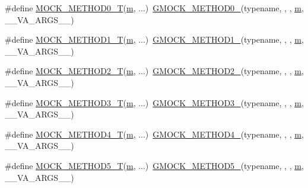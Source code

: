 \begin{DoxyCompactItemize}
\item 
\#define \hyperlink{gmock-generated-function-mockers_8h_a55a5a1a22cec416ead5605a2da39eec8}{M\+O\+C\+K\+\_\+\+M\+E\+T\+H\+O\+D0\+\_\+T}(\hyperlink{app_2main_8cpp_a0d2d8836216fc94b61aa0824eb239db2}{m}, ...)~\hyperlink{gmock-generated-function-mockers_8h_ae0d290ffa58d7c624b2e3487ba1252f4}{G\+M\+O\+C\+K\+\_\+\+M\+E\+T\+H\+O\+D0\+\_\+}(typename, , , \hyperlink{app_2main_8cpp_a0d2d8836216fc94b61aa0824eb239db2}{m}, \+\_\+\+\_\+\+V\+A\+\_\+\+A\+R\+G\+S\+\_\+\+\_\+)
\item 
\#define \hyperlink{gmock-generated-function-mockers_8h_a8e5b9539726be5c7a13f1aa3bcc1f29f}{M\+O\+C\+K\+\_\+\+M\+E\+T\+H\+O\+D1\+\_\+T}(\hyperlink{app_2main_8cpp_a0d2d8836216fc94b61aa0824eb239db2}{m}, ...)~\hyperlink{gmock-generated-function-mockers_8h_a1bc0012d62440dda77208dabdf4925c9}{G\+M\+O\+C\+K\+\_\+\+M\+E\+T\+H\+O\+D1\+\_\+}(typename, , , \hyperlink{app_2main_8cpp_a0d2d8836216fc94b61aa0824eb239db2}{m}, \+\_\+\+\_\+\+V\+A\+\_\+\+A\+R\+G\+S\+\_\+\+\_\+)
\item 
\#define \hyperlink{gmock-generated-function-mockers_8h_adb6e8d8bd6ab614c62d8ecc2ec163e3c}{M\+O\+C\+K\+\_\+\+M\+E\+T\+H\+O\+D2\+\_\+T}(\hyperlink{app_2main_8cpp_a0d2d8836216fc94b61aa0824eb239db2}{m}, ...)~\hyperlink{gmock-generated-function-mockers_8h_a885295ca6bebb15efb3fc786218c5d47}{G\+M\+O\+C\+K\+\_\+\+M\+E\+T\+H\+O\+D2\+\_\+}(typename, , , \hyperlink{app_2main_8cpp_a0d2d8836216fc94b61aa0824eb239db2}{m}, \+\_\+\+\_\+\+V\+A\+\_\+\+A\+R\+G\+S\+\_\+\+\_\+)
\item 
\#define \hyperlink{gmock-generated-function-mockers_8h_a0b1576f68e6161f106e3d9ee7e3ac28b}{M\+O\+C\+K\+\_\+\+M\+E\+T\+H\+O\+D3\+\_\+T}(\hyperlink{app_2main_8cpp_a0d2d8836216fc94b61aa0824eb239db2}{m}, ...)~\hyperlink{gmock-generated-function-mockers_8h_af7c77ba511c631de02bb8c45a6ed3045}{G\+M\+O\+C\+K\+\_\+\+M\+E\+T\+H\+O\+D3\+\_\+}(typename, , , \hyperlink{app_2main_8cpp_a0d2d8836216fc94b61aa0824eb239db2}{m}, \+\_\+\+\_\+\+V\+A\+\_\+\+A\+R\+G\+S\+\_\+\+\_\+)
\item 
\#define \hyperlink{gmock-generated-function-mockers_8h_a17dde4ac8109f0bf1b73e3509e42c879}{M\+O\+C\+K\+\_\+\+M\+E\+T\+H\+O\+D4\+\_\+T}(\hyperlink{app_2main_8cpp_a0d2d8836216fc94b61aa0824eb239db2}{m}, ...)~\hyperlink{gmock-generated-function-mockers_8h_ab6430f2cfad9de4aca5258ea559294bb}{G\+M\+O\+C\+K\+\_\+\+M\+E\+T\+H\+O\+D4\+\_\+}(typename, , , \hyperlink{app_2main_8cpp_a0d2d8836216fc94b61aa0824eb239db2}{m}, \+\_\+\+\_\+\+V\+A\+\_\+\+A\+R\+G\+S\+\_\+\+\_\+)
\item 
\#define \hyperlink{gmock-generated-function-mockers_8h_a3566f9bd057c5cee1841f55cbf685947}{M\+O\+C\+K\+\_\+\+M\+E\+T\+H\+O\+D5\+\_\+T}(\hyperlink{app_2main_8cpp_a0d2d8836216fc94b61aa0824eb239db2}{m}, ...)~\hyperlink{gmock-generated-function-mockers_8h_a9e3ecd392499ab19a4a6d3adcabf56f6}{G\+M\+O\+C\+K\+\_\+\+M\+E\+T\+H\+O\+D5\+\_\+}(typename, , , \hyperlink{app_2main_8cpp_a0d2d8836216fc94b61aa0824eb239db2}{m}, \+\_\+\+\_\+\+V\+A\+\_\+\+A\+R\+G\+S\+\_\+\+\_\+)

\end{DoxyCompactItemize}
